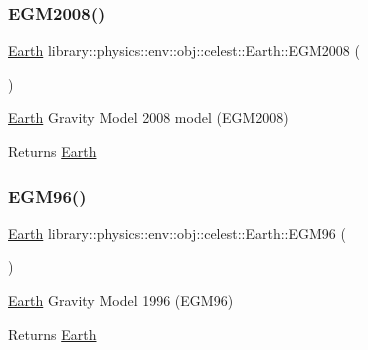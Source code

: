 \subsubsection{\texorpdfstring{E\+G\+M2008()}{EGM2008()}}
{\footnotesize\ttfamily \hyperlink{classlibrary_1_1physics_1_1env_1_1obj_1_1celest_1_1_earth}{Earth} library\+::physics\+::env\+::obj\+::celest\+::\+Earth\+::\+E\+G\+M2008 (\begin{DoxyParamCaption}{ }\end{DoxyParamCaption})\hspace{0.3cm}{\ttfamily [static]}}



\hyperlink{classlibrary_1_1physics_1_1env_1_1obj_1_1celest_1_1_earth}{Earth} Gravity Model 2008 model (E\+G\+M2008) 

\begin{DoxyReturn}{Returns}
\hyperlink{classlibrary_1_1physics_1_1env_1_1obj_1_1celest_1_1_earth}{Earth} 
\end{DoxyReturn}
\mbox{\label{classlibrary_1_1physics_1_1env_1_1obj_1_1celest_1_1_earth_a6774555411628b2a8032186efd14f33d}} 
\subsubsection{\texorpdfstring{E\+G\+M96()}{EGM96()}}
{\footnotesize\ttfamily \hyperlink{classlibrary_1_1physics_1_1env_1_1obj_1_1celest_1_1_earth}{Earth} library\+::physics\+::env\+::obj\+::celest\+::\+Earth\+::\+E\+G\+M96 (\begin{DoxyParamCaption}{ }\end{DoxyParamCaption})\hspace{0.3cm}{\ttfamily [static]}}



\hyperlink{classlibrary_1_1physics_1_1env_1_1obj_1_1celest_1_1_earth}{Earth} Gravity Model 1996 (E\+G\+M96) 

\begin{DoxyReturn}{Returns}
\hyperlink{classlibrary_1_1physics_1_1env_1_1obj_1_1celest_1_1_earth}{Earth} 
\end{DoxyReturn}
\mbox{\label{classlibrary_1_1physics_1_1env_1_1obj_1_1celest_1_1_earth_ab0b1718b4cd072d56aee93a42f10b33f}} 
